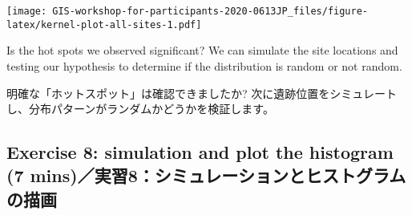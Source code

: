 \documentclass[
  xelatex,ja=standard]{bxjsarticle}
\newenvironment{Shaded}{\begin{snugshade}}{\end{snugshade}}
\newcommand{\CommentTok}[1]{\textcolor[rgb]{0.56,0.35,0.01}{\textit{#1}}}
\newcommand{\DataTypeTok}[1]{\textcolor[rgb]{0.13,0.29,0.53}{#1}}
\newcommand{\DecValTok}[1]{\textcolor[rgb]{0.00,0.00,0.81}{#1}}
\newcommand{\KeywordTok}[1]{\textcolor[rgb]{0.13,0.29,0.53}{\textbf{#1}}}
\newcommand{\NormalTok}[1]{#1}
\newcommand{\OperatorTok}[1]{\textcolor[rgb]{0.81,0.36,0.00}{\textbf{#1}}}
\newcommand{\OtherTok}[1]{\textcolor[rgb]{0.56,0.35,0.01}{#1}}
\newcommand{\StringTok}[1]{\textcolor[rgb]{0.31,0.60,0.02}{#1}}
\begin{document}
\begin{Shaded}
\end{Shaded}

\texttt{[image: GIS-workshop-for-participants-2020-0613JP\_files/figure-latex/kernel-plot-all-sites-1.pdf]}

Is the hot spots we observed significant? We can simulate the site
locations and testing our hypothesis to determine if the distribution is
random or not random.

明確な「ホットスポット」は確認できましたか?
次に遺跡位置をシミュレートし、分布パターンがランダムかどうかを検証します。

\hypertarget{exercise-8-simulation-and-plot-the-histogram-7-minsux5b9fux7fd28ux30b7ux30dfux30e5ux30ecux30fcux30b7ux30e7ux30f3ux3068ux30d2ux30b9ux30c8ux30b0ux30e9ux30e0ux306eux63cfux753b}{%
\subsection{Exercise 8: simulation and plot the histogram (7
mins)／実習8：シミュレーションとヒストグラムの描画}\label{exercise-8-simulation-and-plot-the-histogram-7-minsux5b9fux7fd28ux30b7ux30dfux30e5ux30ecux30fcux30b7ux30e7ux30f3ux3068ux30d2ux30b9ux30c8ux30b0ux30e9ux30e0ux306eux63cfux753b}}
\end{document}
